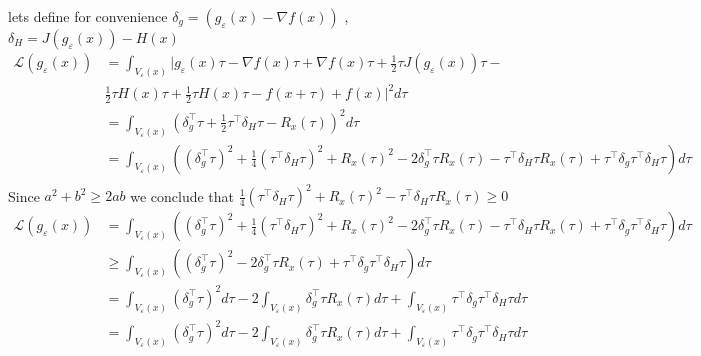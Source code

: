 lets define for convenience \(\delta_g = (g_{\varepsilon}(x)-\nabla f(x))\) , \( \delta_H =  J(g_{\varepsilon}(x)) - H(x) \) 
\begin{align*}
    \mathcal{L}(g_{\varepsilon}(x)) &= \int_{V_{\varepsilon}(x)}|g_{\varepsilon}(x)\tau-\nabla f(x)\tau+\nabla f(x)\tau + \tfrac{1}{2}\tau  J(g_{\varepsilon}(x))\tau - \\& \tfrac{1}{2}\tau H(x) \tau + \tfrac{1}{2}\tau H(x)\tau - f(x+\tau)+f(x)|^2d\tau \\
& = \int_{V_{\varepsilon}(x)} (\delta_g^\top\tau + \tfrac{1}{2}\tau^\top\delta_H\tau - R_x(\tau))^2d\tau \\
& = \int_{V_{\varepsilon}(x)}((\delta_g^\top\tau)^2 + \tfrac{1}{4}(\tau^\top\delta_H\tau)^2 + R_x(\tau)^2 - 2\delta_g^\top\tau R_x(\tau) - \tau^\top\delta_H\tau  R_x(\tau) + \tau^\top\delta_g\tau^\top\delta_H\tau)d\tau\\
\end{align*}
Since \(a^2 + b^2 \geq 2ab\) we conclude that \(\tfrac{1}{4}(\tau^\top\delta_H\tau)^2 + R_x(\tau)^2 - \tau^\top\delta_H\tau R_x(\tau) \geq 0\)
\begin{align*}
    \mathcal{L}(g_{\varepsilon}(x)) & = \int_{V_{\varepsilon}(x)}((\delta_g^\top\tau)^2 + \tfrac{1}{4}(\tau^\top\delta_H\tau)^2 + R_x(\tau)^2 - 2\delta_g^\top\tau R_x(\tau) - \tau^\top\delta_H\tau  R_x(\tau) + \tau^\top\delta_g\tau^\top\delta_H\tau)d\tau\\
    & \geq \int_{V_{\varepsilon}(x)}((\delta_g^\top\tau)^2 - 2\delta_g^\top\tau R_x(\tau) + \tau^\top\delta_g\tau^\top\delta_H\tau)d\tau\\
    & = \int_{V_{\varepsilon}(x)}(\delta_g^\top\tau)^2d\tau - 2\int_{V_{\varepsilon}(x)}\delta_g^\top\tau R_x(\tau)d\tau + \int_{V_{\varepsilon}(x)}\tau^\top\delta_g\tau^\top\delta_H\tau d\tau\\
    & = \int_{V_{\varepsilon}(x)}(\delta_g^\top\tau)^2d\tau - 2\int_{V_{\varepsilon}(x)}\delta_g^\top\tau R_x(\tau)d\tau + \int_{V_{\varepsilon}(x)}\tau^\top\delta_g\tau^\top\delta_H\tau d\tau\\
\end{align*}

